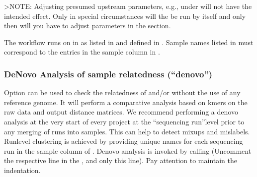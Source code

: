 \documentclass[letterpaper,10pt,english]{sphinxhowto}
\begin{document}
\textgreater{}NOTE: Adjusting presumed upstream parameters, e.g., under  will not have the intended effect. Only in special circumstances will the  be run by itself and only then will you have to adjust parameters in the  section.

The workflow runs on  in  as listed in  and defined in . Sample names listed in  must correspond to the entries in the sample column in .


\subsubsection{De\sphinxhyphen{}Novo Analysis of sample relatedness (“denovo”)}
\label{\detokenize{index:id6}}
Option  can be used to check the relatedness of  and/or  without the use of any reference genome. It will perform a comparative analysis based on k\sphinxhyphen{}mers on the raw data and output distance matrices. We recommend performing a de\sphinxhyphen{}novo analysis at the very start of every project at the “sequencing run”\sphinxhyphen{}level prior to any merging of runs into samples. This can help to detect mix\sphinxhyphen{}ups and mislabels. Run\sphinxhyphen{}level clustering is achieved by providing unique names for each sequencing run in the sample column of . De\sphinxhyphen{}novo analysis is invoked by calling  (Uncomment the respective line in the , and only this line). Pay attention to maintain the indentation.

\begin{sphinxVerbatim}[commandchars=\\\{\}]
 
\end{sphinxVerbatim}
\end{document}
